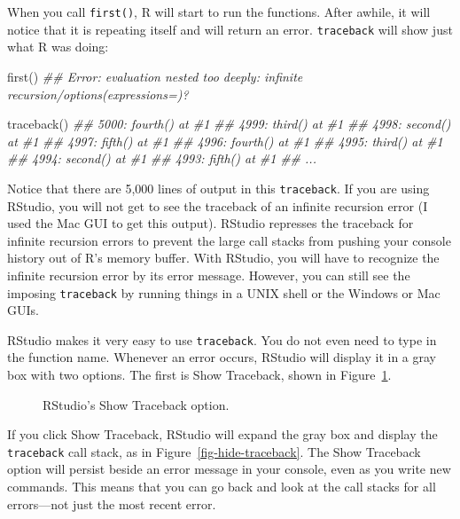 \documentclass[
  letterpaper,
  DIV=11,
  numbers=noendperiod]{scrbook}
\newenvironment{Shaded}{\begin{snugshade}}{\end{snugshade}}
\newcommand{\DocumentationTok}[1]{\textcolor[rgb]{0.37,0.37,0.37}{\textit{#1}}}
\newcommand{\FunctionTok}[1]{\textcolor[rgb]{0.28,0.35,0.67}{#1}}
\newcommand{\NormalTok}[1]{\textcolor[rgb]{0.00,0.23,0.31}{#1}}
\begin{document}
When you call \texttt{first()}, R will start to run the functions. After
awhile, it will notice that it is repeating itself and will return an
error. \texttt{traceback} will show just what R was doing:

\begin{Shaded}
\begin{Highlighting}[]
\FunctionTok{first}\NormalTok{()}
\DocumentationTok{\#\# Error: evaluation nested too deeply: infinite recursion/options(expressions=)?}

\FunctionTok{traceback}\NormalTok{()}
\DocumentationTok{\#\# 5000: fourth() at \#1}
\DocumentationTok{\#\# 4999: third() at \#1}
\DocumentationTok{\#\# 4998: second() at \#1}
\DocumentationTok{\#\# 4997: fifth() at \#1}
\DocumentationTok{\#\# 4996: fourth() at \#1}
\DocumentationTok{\#\# 4995: third() at \#1}
\DocumentationTok{\#\# 4994: second() at \#1}
\DocumentationTok{\#\# 4993: fifth() at \#1}
\DocumentationTok{\#\# ...}
\end{Highlighting}
\end{Shaded}

Notice that there are 5,000 lines of output in this \texttt{traceback}.
If you are using RStudio, you will not get to see the traceback of an
infinite recursion error (I used the Mac GUI to get this output).
RStudio represses the traceback for infinite recursion errors to prevent
the large call stacks from pushing your console history out of R's
memory buffer. With RStudio, you will have to recognize the infinite
recursion error by its error message. However, you can still see the
imposing \texttt{traceback} by running things in a UNIX shell or the
Windows or Mac GUIs.

RStudio makes it very easy to use \texttt{traceback}. You do not even
need to type in the function name. Whenever an error occurs, RStudio
will display it in a gray box with two options. The first is Show
Traceback, shown in Figure~\ref{fig-show-traceback}.

\begin{figure}


\caption{\label{fig-show-traceback}RStudio's Show Traceback option.}

\end{figure}%

If you click Show Traceback, RStudio will expand the gray box and
display the \texttt{traceback} call stack, as in
Figure~\ref{fig-hide-traceback}. The Show Traceback option will persist
beside an error message in your console, even as you write new commands.
This means that you can go back and look at the call stacks for all
errors---not just the most recent error.
\end{document}
